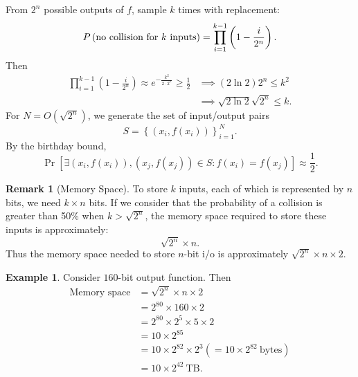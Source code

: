 \documentclass[12pt,openany]{book}
\theoremstyle{definition}
\newtheorem{remark}{Remark}[chapter]
\newtheorem{example}{Example}[chapter]
\newcommand{\set}[1]{\left\{#1\right\}}
\newcommand{\of}[1]{\left( #1 \right)}
\begin{document}
	From $2^n$ possible outputs of $f$, sample $k$ times with replacement: \[
	P\of{\textnormal{no collision for $k$ inputs}}=\prod_{i=1}^{k-1}\of{1-\frac{i}{2^n}}.
	\]
	Then \begin{align*}
	\prod_{i=1}^{k-1}\of{1-\frac{i}{2^n}}\approx e^{-\frac{k^2}{2\cdot 2^n}}\geq\frac{1}{2}
	&\implies (2\ln2)2^n\leq k^2\\
	&\implies \sqrt{2\ln2}\sqrt{2^n}\leq k.
	\end{align*}
	For $N=O(\sqrt{2^n})$, we generate the set of input/output pairs \[
	S=\set{\of{x_i,f\of{x_i}}}_{i=1}^N.
	\] By the birthday bound, \[
	\Pr[\exists(x_i,f(x_i)),(x_j,f(x_j))\in S:f(x_i)=f(x_j)]\approx\frac{1}{2}.
	\]
	\vspace{8pt}
	\begin{remark}[Memory Space]
		To store $k$ inputs, each of which is represented by $n$ bits, we need $k \times n$ bits. If we consider that the probability of a collision is greater than 50\% when $k > \sqrt{2^n}$, the memory space required to store these inputs is approximately: \[
		\sqrt{2^n}\times n.
		\] Thus the memory space needed to store $n$-bit i/o is approximately $\sqrt{2^n}\times n\times 2$.
	\end{remark}
	\vspace{8pt}
	\begin{example}
		Consider $160$-bit output function. Then 
		\begin{align*}
		\text{Memory space} &= \sqrt{2^n} \times n \times 2 \\
		&= 2^{80} \times 160 \times 2 \\
		&= 2^{80} \times 2^5\times 5 \times 2 \\
		&= 10\times 2^{85}\\
		&= 10\times 2^{82} \times 2^3 (= 10\times 2^{82}\ \text{bytes})\\
		&= 10 \times 2^{42}\ \text{TB}.
		\end{align*}
	\end{example}
	
	\newpage
\end{document}
